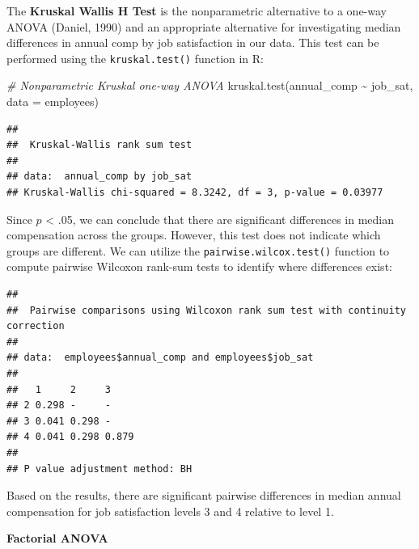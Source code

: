 \documentclass[
]{book}
\newenvironment{Shaded}{\begin{snugshade}}{\end{snugshade}}
\newcommand{\AttributeTok}[1]{\textcolor[rgb]{0.77,0.63,0.00}{#1}}
\newcommand{\CommentTok}[1]{\textcolor[rgb]{0.56,0.35,0.01}{\textit{#1}}}
\newcommand{\FunctionTok}[1]{\textcolor[rgb]{0.00,0.00,0.00}{#1}}
\newcommand{\NormalTok}[1]{#1}
\newcommand{\SpecialCharTok}[1]{\textcolor[rgb]{0.00,0.00,0.00}{#1}}
\newcommand{\StringTok}[1]{\textcolor[rgb]{0.31,0.60,0.02}{#1}}
\begin{document}
The \textbf{Kruskal Wallis H Test} is the nonparametric alternative to a one-way ANOVA (Daniel, 1990) and an appropriate alternative for investigating median differences in annual comp by job satisfaction in our data. This test can be performed using the \texttt{kruskal.test()} function in R:

\begin{Shaded}
\begin{Highlighting}[]
\CommentTok{\# Nonparametric Kruskal one{-}way ANOVA}
\FunctionTok{kruskal.test}\NormalTok{(annual\_comp }\SpecialCharTok{\textasciitilde{}}\NormalTok{ job\_sat, }\AttributeTok{data =}\NormalTok{ employees)}
\end{Highlighting}
\end{Shaded}

\begin{verbatim}
## 
##  Kruskal-Wallis rank sum test
## 
## data:  annual_comp by job_sat
## Kruskal-Wallis chi-squared = 8.3242, df = 3, p-value = 0.03977
\end{verbatim}

Since \(p\) \textless{} .05, we can conclude that there are significant differences in median compensation across the groups. However, this test does not indicate which groups are different. We can utilize the \texttt{pairwise.wilcox.test()} function to compute pairwise Wilcoxon rank-sum tests to identify where differences exist:

\begin{Shaded}
\end{Shaded}

\begin{verbatim}
## 
##  Pairwise comparisons using Wilcoxon rank sum test with continuity correction 
## 
## data:  employees$annual_comp and employees$job_sat 
## 
##   1     2     3    
## 2 0.298 -     -    
## 3 0.041 0.298 -    
## 4 0.041 0.298 0.879
## 
## P value adjustment method: BH
\end{verbatim}

Based on the results, there are significant pairwise differences in median annual compensation for job satisfaction levels 3 and 4 relative to level 1.

\textbf{Factorial ANOVA}
\end{document}
